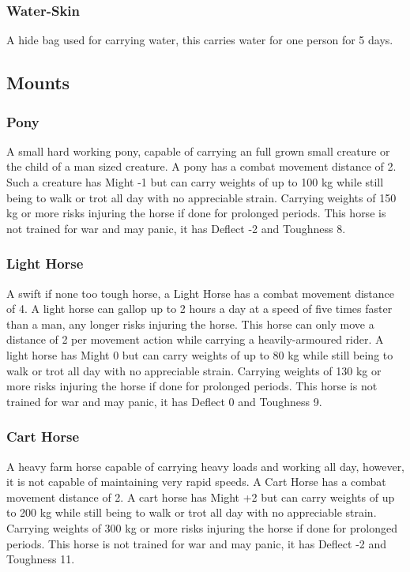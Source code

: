 \documentclass[a4paper,11pt,oneside]{book}
\begin{document}
\subsubsection*{Water-Skin}
A hide bag used for carrying water, this carries water for one person for 5 days.

\subsection{Mounts}
\subsubsection*{Pony}
A small hard working pony, capable of carrying an full grown small creature or the child of a man sized creature. A pony has a combat movement distance of 2. Such a creature has Might -1 but can carry weights of up to 100 kg while still being to walk or trot all day with no appreciable strain. Carrying weights of 150 kg or more risks injuring the horse if done for prolonged periods. This horse is not trained for war and may panic, it has Deflect -2 and Toughness 8.

\subsubsection*{Light Horse}
A swift if none too tough horse, a Light Horse has a combat movement distance of 4. A light horse can gallop up to 2 hours a day at a speed of five times faster than a man, any longer risks injuring the horse. This horse can only move a distance of 2 per movement action while carrying a heavily-armoured rider. A light horse has Might 0 but can carry weights of up to 80 kg while still being to walk or trot all day with no appreciable strain. Carrying weights of 130 kg or more risks injuring the horse if done for prolonged periods. This horse is not trained for war and may panic, it has Deflect 0 and Toughness 9.

\subsubsection*{Cart Horse}
A heavy farm horse capable of carrying heavy loads and working all day, however, it is not capable of maintaining very rapid speeds. A Cart Horse has a combat movement distance of 2. A cart horse has Might +2 but can carry weights of up to 200 kg while still being to walk or trot all day with no appreciable strain. Carrying weights of 300 kg or more risks injuring the horse if done for prolonged periods. This horse is not trained for war and may panic, it has Deflect -2 and Toughness 11.
\end{document}
